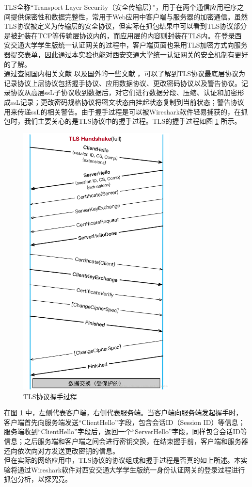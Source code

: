 \qquad 
TLS全称“Transport Layer Security（安全传输层）”，用于在两个通信应用程序之间提供保密性和数据完整性，常用于Web应用中客户端与服务器的加密通信。虽然TLS协议被定义为传输层的安全协议，但实际在抓包结果中可以看到TLS协议部分是被封装在TCP等传输层协议内的，而应用层的内容则封装在TLS内。在登录西安交通大学学生版统一认证网关的过程中，客户端页面也采用TLS加密方式向服务器提交表单，因此通过本实验也能对西安交通大学统一认证网关的安全机制有更好的了解。\\
\qquad
通过查阅国内相关文献 \cite{TLS-1} 以及国外的一些文献 \cite{TLS-2} ，可以了解到TLS协议最底层协议为记录协议上层协议包括握手协议、应用数据协议、更改密码协议以及警告协议。记录协议从高层ssL子协议收到数据后，对它们进行数据分段、压缩、认证和加密形成ssL记录；更改密码规格协议将密文状态由挂起状态复制到当前状态；警告协议用来传递ssL的相关警告。由于握手过程是可以被Wireshark软件轻易捕获的，在抓包时，我们主要关心的是TLS协议中的握手过程。TLS的握手过程如图 \ref{fig1} 所示。\\
\begin{figure}
	\centering
	\includegraphics[width=8cm]{image/TLS-Handshake}
	\caption{TLS协议握手过程 \cite{TLS-3}}
	\label{fig1}
\end{figure}
\qquad
在图 \ref{fig1} 中，左侧代表客户端，右侧代表服务端。当客户端向服务端发起握手时，客户端首先向服务端发送“ClientHello”字段，包含会话ID（Session ID）等信息；服务端收到“ClientHello”字段后，返回一个“ServerHello”字段，同样包含会话ID等信息；之后服务端和客户端之间会进行密钥交换，在结束握手前，客户端和服务器还向依次向对方发送更改密钥的信息。\\
\qquad
但在实际的网络应用中，TLS协议的协议组成和握手过程是否真的如上所述。本实验将通过Wireshark软件对西安交通大学学生版统一身份认证网关的登录过程进行抓包分析，以探究竟。\\